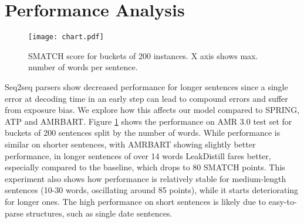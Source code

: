 \documentclass[11pt]{article}
\begin{document}
\begin{table}[t!]

\caption{Performance on AMR 3.0 for different metrics. SMATCH is taken from \citet{opitz-etal-2020-amr}. We use WWLK-k3e2n as proposed in \citet{opitz-frank-2022-better}.}
\label{table:more-metrics}

\end{table}

\section{Performance Analysis}


\begin{figure}[t!]
    \centering
\texttt{[image: chart.pdf]}
    \caption{SMATCH score for buckets of 200 instances. X axis shows max. number of words per sentence.}
    \label{fig:error_sent_length}
\end{figure}


Seq2seq parsers show decreased performance for longer sentences since a single error at decoding time in an early step can lead to compound errors and suffer from exposure bias. We explore how this affects our model compared to SPRING, ATP and AMRBART. Figure \ref{fig:error_sent_length} shows the performance on AMR 3.0 test set for buckets of 200 sentences split by the number of words. While performance is similar on shorter sentences, with AMRBART showing slightly better performance, in longer sentences of over 14 words LeakDistill fares better, especially compared to the baseline, which drops to 80 SMATCH points. This experiment also shows how performance is relatively stable for medium-length sentences (10-30 words, oscillating around 85 points), while it starts deteriorating for longer ones. The high performance on short sentences is likely due to easy-to-parse structures, such as single date sentences.
\end{document}
